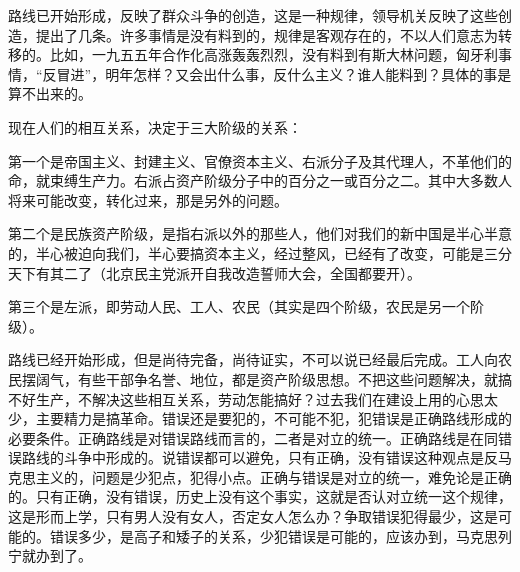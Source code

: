 路线已开始形成，反映了群众斗争的创造，这是一种规律，领导机关反映了这些创造，提出了几条。许多事情是没有料到的，规律是客观存在的，不以人们意志为转移的。比如，一九五五年合作化高涨轰轰烈烈，没有料到有斯大林问题，匈牙利事情，“反冒进”，明年怎样？又会出什么事，反什么主义？谁人能料到？具体的事是算不出来的。

现在人们的相互关系，决定于三大阶级的关系：

第一个是帝国主义、封建主义、官僚资本主义、右派分子及其代理人，不革他们的命，就束缚生产力。右派占资产阶级分子中的百分之一或百分之二。其中大多数人将来可能改变，转化过来，那是另外的问题。

第二个是民族资产阶级，是指右派以外的那些人，他们对我们的新中国是半心半意的，半心被迫向我们，半心要搞资本主义，经过整风，已经有了改变，可能是三分天下有其二了（北京民主党派开自我改造誓师大会，全国都要开）。

第三个是左派，即劳动人民、工人、农民（其实是四个阶级，农民是另一个阶级）。

路线已经开始形成，但是尚待完备，尚待证实，不可以说已经最后完成。工人向农民摆阔气，有些干部争名誉、地位，都是资产阶级思想。不把这些问题解决，就搞不好生产，不解决这些相互关系，劳动怎能搞好？过去我们在建设上用的心思太少，主要精力是搞革命。错误还是要犯的，不可能不犯，犯错误是正确路线形成的必要条件。正确路线是对错误路线而言的，二者是对立的统一。正确路线是在同错误路线的斗争中形成的。说错误都可以避免，只有正确，没有错误这种观点是反马克思主义的，问题是少犯点，犯得小点。正确与错误是对立的统一，难免论是正确的。只有正确，没有错误，历史上没有这个事实，这就是否认对立统一这个规律，这是形而上学，只有男人没有女人，否定女人怎么办？争取错误犯得最少，这是可能的。错误多少，是高子和矮子的关系，少犯错误是可能的，应该办到，马克思列宁就办到了。

